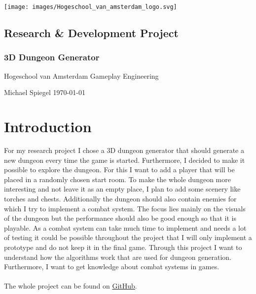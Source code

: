 \documentclass[a4paper,11pt,oneside]{scrreprt}
\begin{document}
\nocite{*}

\thispagestyle{empty}
\begin{titlepage}
  \begin{flushright}
  \texttt{[image: images/Hogeschool\_van\_amsterdam\_logo.svg]}
  \end{flushright}
  \begin{flushleft}
  \section*{Research \& Development Project}
  \subsection*{3D Dungeon Generator}

  \vspace{1cm}
  Hogeschool van Amsterdam\newline
  Gameplay Engineering

  \vspace{0.5cm}

  Michael Spiegel\newline
  \today
  \end{flushleft}
\end{titlepage}

\tableofcontents

\chapter{Introduction}
\label{chapter:introduction}
For my research project I chose a 3D dungeon generator that should generate a new dungeon every time the game is started. Furthermore, I decided to make it possible to explore the dungeon. For this I want to add a player that will be placed in a randomly chosen start room. To make the whole dungeon more interesting and not leave it as an empty place, I plan to add some scenery like torches and chests. Additionally the dungeon should also contain enemies for which I try to implement a combat system. The focus lies mainly on the visuals of the dungeon but the performance should also be good enough so that it is playable. As a combat system can take much time to implement and needs a lot of testing it could be possible throughout the project that I will only implement a prototype and do not keep it in the final game. Through this project I want to understand how the algorithms work that are used for dungeon generation. Furthermore, I want to get knowledge about combat systems in games.
\\
\\
The whole project can be found on \href{https://github.com/Smightym8/3DDungeonGenerator}{GitHub}.
\end{document}
